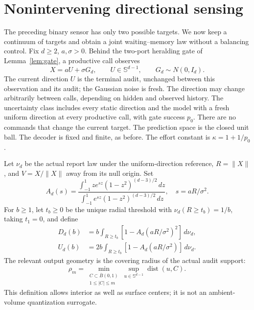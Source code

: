 \section{Nonintervening directional sensing}
\label{sec:directional}
The preceding binary sensor has only two possible targets. We now keep a continuum of targets and obtain a joint waiting--memory law without a balancing control. Fix $d\ge2$, $a,\sigma>0$. Behind the two-port heralding gate of Lemma~\ref{lem:gate}, a productive call observes
\begin{equation}\label{eq:directional-kernel}
 X=aU+\sigma G_d,\qquad U\in\mathbb S^{d-1},\qquad G_d\sim N(0,I_d).
\end{equation}
The current direction $U$ is the terminal audit, unchanged between this observation and its audit; the Gaussian noise is fresh. The direction may change arbitrarily between calls, depending on hidden and observed history. The uncertainty class includes every static direction and the model with a fresh uniform direction at every productive call, with gate success $p_0$. There are no commands that change the current target. The prediction space is the closed unit ball. The decoder is fixed and finite, as before. The effort constant is $\kappa=1+1/p_0$.

Let $\nu_d$ be the actual report law under the uniform-direction reference, $R=\|X\|$, and $V=X/\|X\|$ away from its null origin. Set
\begin{equation}\label{eq:directional-A}
 A_d(s)=\frac{\int_{-1}^{1}z e^{sz}(1-z^2)^{(d-3)/2}\,dz}
              {\int_{-1}^{1}e^{sz}(1-z^2)^{(d-3)/2}\,dz},\quad
 s=aR/\sigma^2.
\end{equation}
For $b\ge1$, let $t_b\ge0$ be the unique radial threshold with $\nu_d(R\ge t_b)=1/b$, taking $t_1=0$, and define
\begin{align}
 D_d(b)&=b\int_{R\ge t_b}[1-A_d(aR/\sigma^2)^2]\,d\nu_d,\label{eq:directional-D}\\
 U_d(b)&=2b\int_{R\ge t_b}[1-A_d(aR/\sigma^2)]\,d\nu_d.\label{eq:directional-U}
\end{align}
The relevant output geometry is the covering radius of the actual audit support:
\begin{equation}\label{eq:directional-radius}
 \rho_m=\min_{\substack{C\subset\overline B(0,1)\\1\le |C|\le m}}
            \sup_{u\in\mathbb S^{d-1}}\operatorname{dist}(u,C).
\end{equation}
This definition allows interior as well as surface centers; it is not an ambient-volume quantization surrogate.

